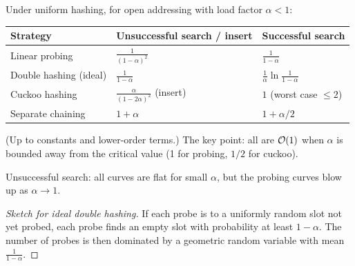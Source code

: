 Under uniform hashing, for open addressing with load factor $\alpha < 1$:
\begin{center}
\begin{tabular}{lll}
\toprule
Strategy & Unsuccessful search / insert & Successful search\\
\midrule
Linear probing & $\frac{1}{(1-\alpha)^2}$ & $\frac{1}{1-\alpha}$\\
Double hashing (ideal) & $\frac{1}{1-\alpha}$ & $\frac{1}{\alpha}\ln\frac{1}{1-\alpha}$\\
Cuckoo hashing & $\frac{\alpha}{(1-2\alpha)^2}$ (insert) & $1$ (worst case $\le 2$)\\
Separate chaining & $1 + \alpha$ & $1 + \alpha/2$\\
\bottomrule
\end{tabular}
\end{center}
(Up to constants and lower-order terms.) The key point: all are $\mathcal{O}(1)$ when
$\alpha$ is bounded away from the critical value (1 for probing, $1/2$ for cuckoo).

\begin{center}
\end{center}
Unsuccessful search: all curves are flat for small $\alpha$, but the probing curves blow up as
$\alpha \to 1$.

\begin{proof}[Sketch for ideal double hashing]
If each probe is to a uniformly random slot not yet probed, each probe finds an
empty slot with probability at least $1 - \alpha$. The number of probes is then
dominated by a geometric random variable with mean $\frac1{1-\alpha}$.
\end{proof}

